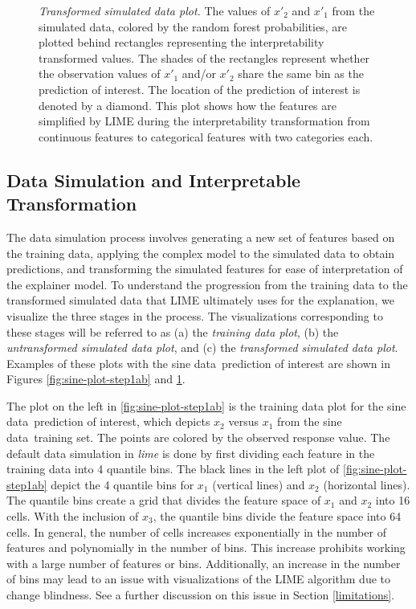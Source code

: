 \documentclass[AMS,STIX2COL]{WileyNJD-v2}\usepackage[]{graphicx}\usepackage[]{color}
\newenvironment{knitrout}{}{} %
\newcommand{\data}{sine data}
\begin{document}
{\begin{figure}[!htbp]
\begin{knitrout}
\end{knitrout}
\caption{\emph{Transformed simulated data plot.} The values of $x'_2$ and $x'_1$ from the simulated data, colored by the random forest probabilities, are plotted behind rectangles representing the interpretability transformed values. The shades of the rectangles represent whether the observation values of $x'_1$ and/or $x'_2$ share the same bin as the prediction of interest. The location of the prediction of interest is denoted by a diamond. This plot shows how the features are simplified by LIME during the interpretability transformation from continuous features to categorical features with two categories each.}
\label{fig:sine-plot-step1c}
\end{figure}

\subsection{Data Simulation and Interpretable Transformation} \label{step1}

The data simulation process involves generating a new set of features based on the training data, applying the complex model to the simulated data to obtain predictions, and transforming the simulated features for ease of interpretation of the explainer model. To understand the progression from the training data to the transformed simulated data that LIME ultimately uses for the explanation, we visualize the three stages in the process. The visualizations corresponding to these stages will be referred to as (a) the \emph{training data plot}, (b) the \emph{untransformed simulated data plot}, and (c) the \emph{transformed simulated data plot}. Examples of these plots with the \data \ prediction of interest are shown in Figures \ref{fig:sine-plot-step1ab} and \ref{fig:sine-plot-step1c}.

The plot on the left in \autoref{fig:sine-plot-step1ab} is the training data plot for the \data \ prediction of interest, which depicts $x_2$ versus $x_1$ from the \data \ training set. The points are colored by the observed response value. The default data simulation in \emph{lime} is done by first dividing each feature in the training data into 4 quantile bins. The black lines in the left plot of \autoref{fig:sine-plot-step1ab} depict the 4 quantile bins for $x_1$ (vertical lines) and $x_2$ (horizontal lines). The quantile bins create a grid that divides the feature space of $x_1$ and $x_2$ into 16 cells. With the inclusion of $x_3$, the quantile bins divide the feature space into 64 cells. In general, the number of cells increases exponentially in the number of features and polynomially in the number of bins. %
This increase prohibits working with a large number of features or bins. Additionally, an increase in the number of bins may lead to an issue with visualizations of the LIME algorithm due to change blindness. See a further discussion on this issue in Section \ref{limitations}.

}
\end{document}
